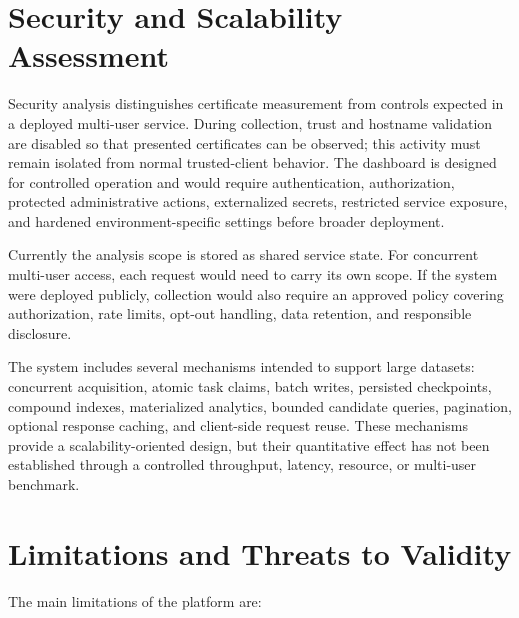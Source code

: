 \section{Security and Scalability Assessment}
\label{sec:security-analysis}

Security analysis distinguishes certificate measurement from controls expected
in a deployed multi-user service. During collection, trust and hostname
validation are disabled so that presented certificates can be observed; this
activity must remain isolated from normal trusted-client behavior. The
dashboard is designed for controlled operation and would require
authentication, authorization, protected administrative actions, externalized
secrets, restricted service exposure, and hardened environment-specific
settings before broader deployment.

Currently the analysis scope is stored as shared service state. For concurrent
multi-user access, each request would need to carry its own scope. If the
system were deployed publicly, collection would also require an approved policy
covering authorization, rate limits, opt-out handling, data retention, and
responsible disclosure.

The system includes several mechanisms intended to support large datasets:
concurrent acquisition, atomic task claims, batch writes, persisted
checkpoints, compound indexes, materialized analytics, bounded candidate
queries, pagination, optional response caching, and client-side request reuse.
These mechanisms provide a scalability-oriented design, but their quantitative
effect has not been established through a controlled throughput, latency,
resource, or multi-user benchmark.

\section{Limitations and Threats to Validity}
\label{sec:implementation-limitations-drift}

The main limitations of the platform are:

